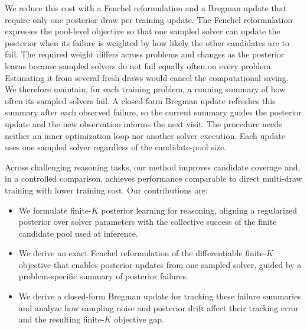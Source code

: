 We reduce this cost with a Fenchel reformulation and a Bregman update that
require only one posterior draw per training update. The Fenchel reformulation
expresses the pool-level objective so that one sampled solver can update the
posterior when its failure is weighted by how likely the other candidates are
to fail. The required weight differs across problems and changes as the
posterior learns because sampled solvers do not fail equally often on every
problem. Estimating it from several fresh draws would cancel the computational
saving. We therefore maintain, for each training problem, a running summary of
how often its sampled solvers fail. A closed-form Bregman update refreshes this
summary after each observed failure, so the current summary guides the
posterior update and the new observation informs the next visit. The procedure
needs neither an inner optimization loop nor another solver execution. Each
update uses one sampled solver regardless of the candidate-pool size.

Across challenging reasoning tasks, our method improves candidate coverage
and, in a controlled comparison, achieves performance comparable to direct
multi-draw training with lower training cost. Our contributions are:

\begin{itemize}
  \item We formulate finite-$K$ posterior learning for reasoning, aligning a
  regularized posterior over solver parameters with the collective success of
  the finite candidate pool used at inference.

  \item We derive an exact Fenchel reformulation of the differentiable
  finite-$K$ objective that enables posterior updates from one sampled solver,
  guided by a problem-specific summary of posterior failures.

  \item We derive a closed-form Bregman update for tracking these failure
  summaries and analyze how sampling noise and posterior drift affect their
  tracking error and the resulting finite-$K$ objective gap.
\end{itemize}
